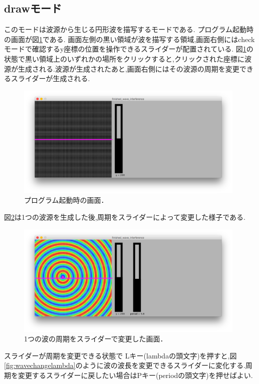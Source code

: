 \subsection{drawモード}
このモードは波源から生じる円形波を描写するモードである. プログラム起動時の画面が図\ref{fig:0wave}である.
画面左側の黒い領域が波を描写する領域,画面右側にはcheckモードで確認するy座標の位置を操作できるスライダーが配置されている. 
図\ref{fig:0wave}の状態で黒い領域上のいずれかの場所をクリックすると,クリックされた座標に波源が生成される.波源が生成されたあと,画面右側にはその波源の周期を変更できるスライダーが生成される.
\begin{figure}[H]
 \begin{center}
  \includegraphics[width=110mm]{../result/0wave.png}
 \end{center}
 \caption{プログラム起動時の画面．}
 \label{fig:0wave}
\end{figure}



図\ref{fig:wave}は1つの波源を生成した後,周期をスライダーによって変更した様子である.
\begin{figure}[H]
 \begin{center}
  \includegraphics[width=110mm]{../result/wave.png}
 \end{center}
 \caption{1つの波の周期をスライダーで変更した画面．}
 \label{fig:wave}
\end{figure}
スライダーが周期を変更できる状態で
Lキー(lambdaの頭文字)を押すと,図\ref{fig:wavechangelambda}のように波の波長を変更できるスライダーに変化する.周期を変更するスライダーに戻したい場合はPキー(periodの頭文字)を押せばよい.

